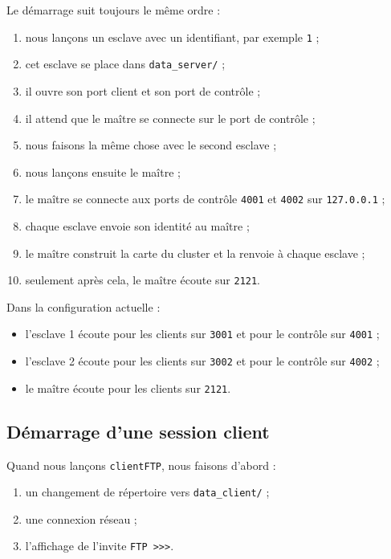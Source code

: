 \documentclass[a4paper,11pt]{article}
\begin{document}
Le démarrage suit toujours le même ordre :

\begin{enumerate}[leftmargin=*]
    \item nous lançons un esclave avec un identifiant, par exemple \texttt{1} ;
    \item cet esclave se place dans \texttt{data\_server/} ;
    \item il ouvre son port client et son port de contrôle ;
    \item il attend que le maître se connecte sur le port de contrôle ;
    \item nous faisons la même chose avec le second esclave ;
    \item nous lançons ensuite le maître ;
    \item le maître se connecte aux ports de contrôle \texttt{4001} et
    \texttt{4002} sur \texttt{127.0.0.1} ;
    \item chaque esclave envoie son identité au maître ;
    \item le maître construit la carte du cluster et la renvoie à chaque esclave ;
    \item seulement après cela, le maître écoute sur \texttt{2121}.
\end{enumerate}

Dans la configuration actuelle :

\begin{itemize}[leftmargin=*]
    \item l'esclave 1 écoute pour les clients sur \texttt{3001} et pour le contrôle sur \texttt{4001} ;
    \item l'esclave 2 écoute pour les clients sur \texttt{3002} et pour le contrôle sur \texttt{4002} ;
    \item le maître écoute pour les clients sur \texttt{2121}.
\end{itemize}

\subsection{Démarrage d'une session client}

Quand nous lançons \texttt{clientFTP}, nous faisons d'abord :

\begin{enumerate}[leftmargin=*]
    \item un changement de répertoire vers \texttt{data\_client/} ;
    \item une connexion réseau ;
    \item l'affichage de l'invite \texttt{FTP >>>}.
\end{enumerate}
\end{document}
